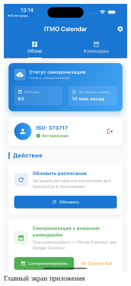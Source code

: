 \begin{figure}[h!]
    \centering
    \includegraphics[width=0.6\textwidth]{images/main-screen.png}
    \caption{Главный экран приложения}
    \label{fig:main-screen}
\end{figure}

